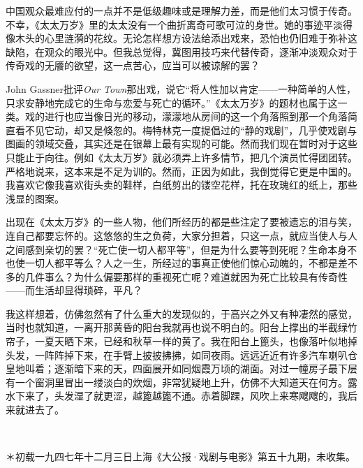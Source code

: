 \par 中国观众最难应付的一点并不是低级趣味或是理解力差，而是他们太习惯于传奇。不幸，《太太万岁》里的太太没有一个曲折离奇可歌可泣的身世。她的事迹平淡得像木头的心里涟漪的花纹。无论怎样想方设法给添出戏来，恐怕也仍旧难于弥补这缺陷，在观众的眼光中。但我总觉得，冀图用技巧来代替传奇，逐渐冲淡观众对于传奇戏的无餍的欲望，这一点苦心，应当可以被谅解的罢？
\par John Gassner批评\textsl{Our Town}那出戏，说它“将人性加以肯定——一种简单的人性，只求安静地完成它的生命与恋爱与死亡的循环。”《太太万岁》的题材也属于这一类。戏的进行也应当像日光的移动，濛濛地从房间的这一个角落照到那一个角落简直看不见它动，却又是倏忽的。梅特林克一度提倡过的“静的戏剧”，几乎使戏剧与图画的领域交叠，其实还是在银幕上最有实现的可能。然而我们现在暂时对于这些只能止于向往。例如《太太万岁》就必须弄上许多情节，把几个演员忙得团团转。严格地说来，这本来是不足为训的。然而，正因为如此，我倒觉得它更是中国的。我喜欢它像我喜欢街头卖的鞋样，白纸剪出的镂空花样，托在玫瑰红的纸上，那些浅显的图案。
\par 出现在《太太万岁》的一些人物，他们所经历的都是些注定了要被遗忘的泪与笑，连自己都要忘怀的。这悠悠的生之负荷，大家分担着，只这一点，就应当使人与人之间感到亲切的罢？“死亡使一切人都平等”，但是为什么要等到死呢？生命本身不也使一切人都平等么？人之一生，所经过的事真正使他们惊心动魄的，不都是差不多的几件事么？为什么偏要那样的重视死亡呢？难道就因为死亡比较具有传奇性——而生活却显得琐碎，平凡？
\par 我这样想着，仿佛忽然有了什么重大的发现似的，于高兴之外又有种凄然的感觉，当时也就知道，一离开那黄昏的阳台我就再也说不明白的。阳台上撑出的半截绿竹帘子，一夏天晒下来，已经和秋草一样的黄了。我在阳台上篦头，也像落叶似地掉头发，一阵阵掉下来，在手臂上披披拂拂，如同夜雨。远远近近有许多汽车喇叭仓皇地叫着；逐渐暗下来的天，四面展开如同烟霞万顷的湖面。对过一幢房子最下层有一个窗洞里冒出一缕淡白的炊烟，非常犹疑地上升，仿佛不大知道天在何方。露水下来了，头发湿了就更涩，越篦越篦不通。赤着脚踝，风吹上来寒飕飕的，我后来就进去了。
\par  
\par ＊初载一九四七年十二月三日上海《大公报·戏剧与电影》第五十九期，未收集。

